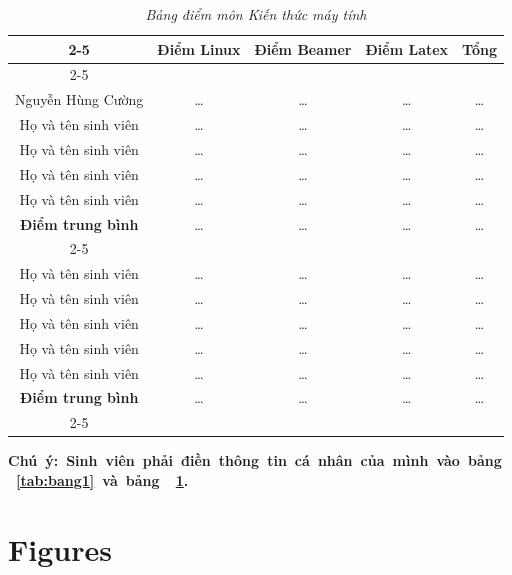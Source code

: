 \documentclass[a4paper,12pt]{article}
\begin{document}
\begin{table}[tbh]
    \centering
    \caption{\textit{Bảng điểm môn Kiến thức máy tính}}
    \vspace{5mm}
    \begin{tabular}{|c|c|c|c|c|}
       \cline{2-5}
       \multicolumn{1}{c}{} & \multicolumn{1}{|l}{\textbf{Điểm Linux}} & \multicolumn{1}{c}{\textbf{Điểm Beamer}} & \multicolumn{1}{c}{\textbf{Điểm Latex}} & \multicolumn{1}{c|}{\textbf{Tổng}}\\
       \cline{2-5}
       \multicolumn{5}{l}{\textbf{\textit{Nhóm 1}}}\\
       \hline
       Nguyễn Hùng Cường & \ldots & \ldots & \ldots & \ldots \\
       \hline
       Họ và tên sinh viên & \ldots & \ldots & \ldots & \ldots \\
       \hline 
       Họ và tên sinh viên & \ldots & \ldots & \ldots & \ldots \\
       \hline
       Họ và tên sinh viên & \ldots & \ldots & \ldots & \ldots \\
       \hline
       Họ và tên sinh viên & \ldots & \ldots & \ldots & \ldots \\
       \hline
       \multicolumn{1}{c|}{\textbf{Điểm trung bình}} & \ldots & \ldots & \ldots & \ldots \\
       \cline{2-5}
       \multicolumn{5}{l}{\textbf{\textit{Nhóm 2}}}\\
       \hline
       Họ và tên sinh viên & \ldots & \ldots & \ldots & \ldots \\
       \hline
       Họ và tên sinh viên & \ldots & \ldots & \ldots & \ldots \\
       \hline 
       Họ và tên sinh viên & \ldots & \ldots & \ldots & \ldots \\
       \hline
       Họ và tên sinh viên & \ldots & \ldots & \ldots & \ldots \\
       \hline
       Họ và tên sinh viên & \ldots & \ldots & \ldots & \ldots \\
       \hline
       \multicolumn{1}{c|}{\textbf{Điểm trung bình}} & \ldots & \ldots & \ldots & \ldots \\
       \cline{2-5}
    \end{tabular}
    \label{tab:bang2}
\end{table}
\pagebreak
\centerline{\mbox{\textbf{Chú ý: Sinh viên phải điền thông tin cá nhân của mình vào \linebreak bảng ~\ref{tab:bang1} và bảng ~\ref{tab:bang2}.}}}
\newpage
\section{Figures}
\end{document}
